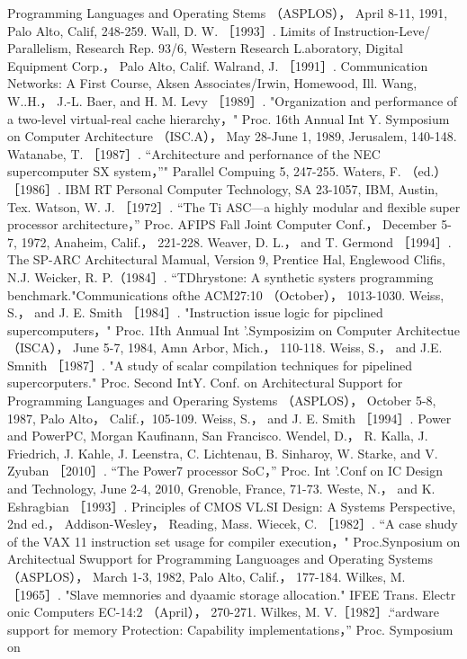 Programming Languages and Operating Stems （ASPLOS）， April 8-11, 1991, Palo Alto, Calif, 248-259.
Wall, D. W. ［1993］. Limits of Instruction-Leve/ Parallelism, Research Rep. 93/6, Western Research L.aboratory, Digital
Equipment Corp.， Palo Alto, Calif.
Walrand, J. ［1991］. Communication Networks: A First Course, Aksen Associates/Irwin, Homewood, Ill.
Wang, W..H.， J.-L. Baer, and H. M. Levy ［1989］. "Organization and performance of a two-level virtual-real cache hierarchy，"
Proc. 16th Annual Int Y. Symposium on Computer Architecture （ISC.A）， May 28-June 1, 1989, Jerusalem, 140-148.
Watanabe, T. ［1987］. “Architecture and perfornance of the NEC supercomputer SX system，”" Parallel Compuing 5, 247-255.
Waters, F. （ed.） ［1986］. IBM RT Personal Computer Technology, SA 23-1057, IBM, Austin, Tex.
Watson, W. J. ［1972］. “The Ti ASC—a highly modular and flexible super processor architecture，” Proc. AFIPS Fall Joint
Computer Conf.， December 5-7, 1972, Anaheim, Calif.， 221-228.
Weaver, D. L.， and T. Germond ［1994］. The SP-ARC Architectural Mamual, Version 9, Prentice Hal, Englewood Clifis, N.J.
Weicker, R. P.（1984］. “TDhrystone: A synthetic systers programming benchmark."Communications ofthe ACM27:10 （October），
1013-1030.
Weiss, S.， and J. E. Smith ［1984］. "Instruction issue logic for pipclined supercomputers，" Proc. 1Ith Anmual Int '.Symposizim on
Computer Architectue （ISCA）， June 5-7, 1984, Amn Arbor, Mich.， 110-118.
Weiss, S.， and J.E. Smnith ［1987］. "A study of scalar compilation techniques for pipelined supercorputers." Proc. Second IntY.
Conf. on Architectural Support for Programming Languages and Operaring Systems （ASPLOS）， October 5-8, 1987, Palo Alto，
Calif.，105-109.
Weiss, S.， and J. E. Smith ［1994］. Power and PowerPC, Morgan Kaufinann, San Francisco.
Wendel, D.， R. Kalla, J. Friedrich, J. Kahle, J. Leenstra, C. Lichtenau, B. Sinharoy, W. Starke, and V. Zyuban ［2010］. “The
Power7 processor SoC，” Proc. Int '.Conf on IC Design and Technology, June 2-4, 2010, Grenoble, France, 71-73.
Weste, N.， and K. Eshragbian ［1993］. Principles of CMOS VL.SI Design: A Systems Perspective, 2nd ed.， Addison-Wesley，
Reading, Mass.
Wiecek, C. ［1982］. “A case shudy of the VAX 11 instruction set usage for compiler execution，" Proc.Synposium on Architectual
Swupport for Programming Languoages and Operating Systems （ASPLOS）， March 1-3, 1982, Palo Alto, Calif.， 177-184.
Wilkes, M. ［1965］. "Slave memnories and dyaamic storage allocation." IFEE Trans. Electr onic Computers EC-14:2 （April），
270-271.
Wilkes, M. V.［1982］.“ardware support for memory Protection: Capability implementations，” Proc. Symposium on
